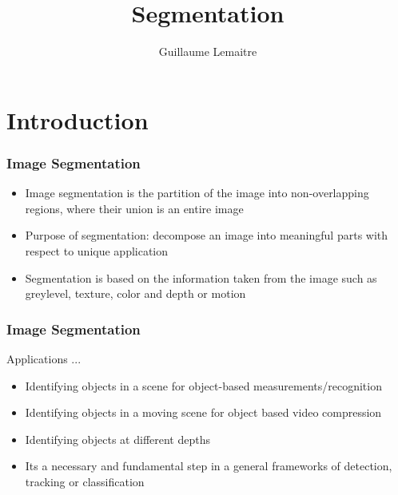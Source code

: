 \documentclass{beamer}
\title{Segmentation}
\author{Guillaume Lemaitre}
\institute{Universit\'e de Bourgogne}
\begin{document}
\begin{frame}
  \titlepage
\end{frame}

\begin{frame}
  \tableofcontents[sectionstyle=show,subsectionstyle=show,subsubsectionstyle=hide]
\end{frame}

\section{Introduction}
\begin{frame}
\frametitle{Image Segmentation}
\begin{itemize}
\item Image segmentation is the partition of the image into non-overlapping regions, where their union is an entire image
\item Purpose of segmentation: decompose an image into meaningful parts with respect to unique application
\item Segmentation is based on the information taken from the image such as greylevel, texture, color and depth or motion
\end{itemize}
\end{frame}

\begin{frame}
\frametitle{Image Segmentation}
\begin{block}{Applications ...}
\begin{itemize}
\item Identifying objects in a scene for object-based measurements/recognition
\item Identifying objects in a moving scene for object based video compression
\item Identifying objects at different depths
\item Its a necessary and fundamental step in a general frameworks of detection, tracking or classification 
\end{itemize}
\end{block}
\end{frame}
\end{document}
